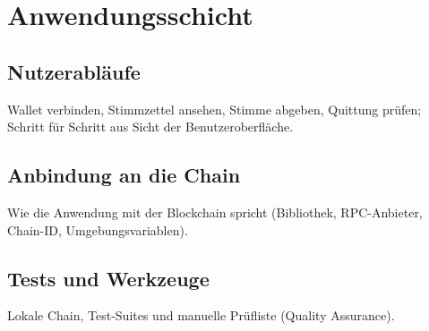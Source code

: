\chapter{Anwendungsschicht}

\section{Nutzerabläufe}
Wallet verbinden, Stimmzettel ansehen, Stimme abgeben, Quittung prüfen;
Schritt für Schritt aus Sicht der Benutzeroberfläche.

\section{Anbindung an die Chain}
Wie die Anwendung mit der Blockchain spricht (Bibliothek, RPC-Anbieter,
Chain-ID, Umgebungsvariablen).

\section{Tests und Werkzeuge}
Lokale Chain, Test-Suites und manuelle Prüfliste (Quality Assurance).
